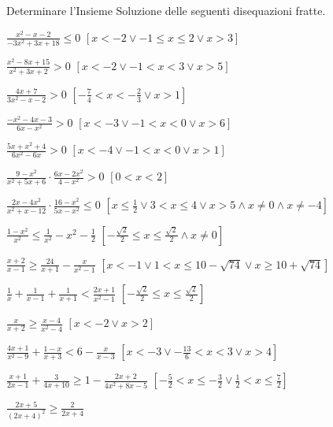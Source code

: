 \begin{esercizio}[\Ast]
 \label{ese:4.64}
Determinare l'Insieme Soluzione delle seguenti disequazioni fratte.
\begin{enumeratea}
\item \(\frac{x^2-x-2}{-3x^2+3x+18}\le 0\) 
 \hfill \(\left[x<-2\vee -1\le x\le 2\vee x>3\right]\)
\item \(\frac{x^2-8x+15}{x^2+3x+2}>0\) 
 \hfill \(\left[x<-2\vee -1<x<3\vee x>5\right]\)
\item \(\frac{4x+7}{3x^2-x-2}>0\) 
 \hfill \(\left[-\frac 7 4<x<-\frac 2 3\vee x>1\right]\)
\item \(\frac{-x^2-4x-3}{6x-x^2}>0\) 
 \hfill \(\left[x<-3\vee -1<x<0\vee x>6\right]\)
\item \(\frac{5x+x^2+4}{6x^2-6x}>0\) 
 \hfill \(\left[x<-4\vee -1<x<0\vee x>1\right]\)
\item \(\frac{9-x^2}{x^2+5x+6}\cdot \frac{6x-2x^2}{4-x^2}>0\) 
 \hfill \(\left[0<x<2\right]\)
\item \(\frac{2x-4x^2}{x^2+x-12}\cdot \frac{16-x^2}{5x-x^2}\le 0\) 
 \hfill \(\left[x\le \frac 1 2\vee 3<x\le 4\vee x>5 \wedge 
 x\neq 0 \wedge x\neq -4\right]\)
\item \(\frac{1-x^2}{x^2}\le \frac 1{x^2}-x^2-\frac 1 2\) 
 \hfill \(\left[-\frac{\sqrt 2} 2\le x\le \frac{\sqrt 2} 2 \wedge 
 x\neq 0\right]\)
\item \(\frac{x+2}{x-1}\ge \frac{24}{x+1}-\frac x{x^2-1}\) 
 \hfill \(\left[x<-1\vee 1<x\le 10-\sqrt{74}\vee x\ge 10+\sqrt{74}\right]\)
\item \(\frac 1 x+\frac 1{x-1}+\frac 1{x+1}<\frac{2x+1}{x^2-1}\) 
 \hfill \(\left[-\frac{\sqrt 2} 2\le x\le \frac{\sqrt 2} 2\right]\)
\item \(\frac x{x+2}\ge \frac{x-4}{x^2-4}\) 
 \hfill \(\left[x<-2\vee x>2\right]\)
\item \(\frac{4x+1}{x^2-9}+\frac{1-x}{x+3}<6-\frac x{x-3}\) 
 \hfill \(\left[x<-3\vee -\frac{13} 6<x<3\vee x>4\right]\)
\item \(\frac{x+1}{2x-1}+\frac 3{4x+10}\ge 1-\frac{2x+2}{4x^2+8x-5}\) 
 \hfill \(\left[-\frac 5 2<x\le -\frac 3 2\vee \frac 1 2<x\le \frac 7 2\right]\)
\item \(\frac{2x+5}{(2x+4)^2}\ge \frac 2{2x+4}\) 

\end{enumeratea}
\end{esercizio}
